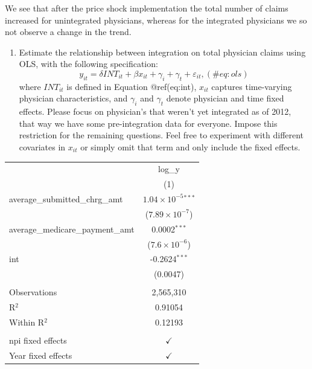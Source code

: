 \documentclass[
  12pt,
]{article}
\providecommand{\tightlist}{%
  \setlength{\itemsep}{0pt}\setlength{\parskip}{0pt}}
\begin{document}
We see that after the price shock implementation the total number of
claims increased for unintegrated physicians, whereas for the integrated
physicians we so not observe a change in the trend.

\begin{enumerate}
\def\labelenumi{\arabic{enumi}.}
\setcounter{enumi}{2}
\tightlist
\item
  Estimate the relationship between integration on total physician
  claims using OLS, with the following specification: \begin{equation}
   y_{it} = \delta INT_{it} + \beta x_{it} + \gamma_{i} + \gamma_{t} + \varepsilon_{it}, 
   (\#eq:ols)
   \end{equation} where \(INT_{it}\) is defined in Equation
  @ref(eq:int), \(x_{it}\) captures time-varying physician
  characteristics, and \(\gamma_{i}\) and \(\gamma_{t}\) denote
  physician and time fixed effects. Please focus on physician's that
  weren't yet integrated as of 2012, that way we have some
  pre-integration data for everyone. Impose this restriction for the
  remaining questions. Feel free to experiment with different covariates
  in \(x_{it}\) or simply omit that term and only include the fixed
  effects.
\end{enumerate}

\begingroup
\centering
\begin{tabular}{lc}
   \toprule
                                      & log\_y\\   
                                      & (1)\\  
   \midrule 
   average\_submitted\_chrg\_amt      & $1.04\times 10^{-5}$$^{***}$\\    
                                      & ($7.89\times 10^{-7}$)\\    
   average\_medicare\_payment\_amt    & 0.0002$^{***}$\\   
                                      & ($7.6\times 10^{-6}$)\\    
   int                                & -0.2624$^{***}$\\   
                                      & (0.0047)\\   
    \\
   Observations                       & 2,565,310\\  
   R$^2$                              & 0.91054\\  
   Within R$^2$                       & 0.12193\\  
    \\
   npi fixed effects                  & $\checkmark$\\   
   Year fixed effects                 & $\checkmark$\\   
   \bottomrule
\end{tabular}
\par\endgroup
\end{document}
